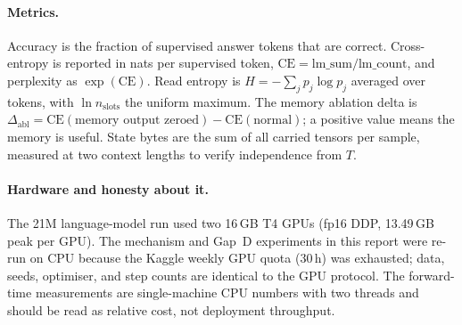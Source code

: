 \paragraph{Metrics.}
Accuracy is the fraction of supervised answer tokens that are correct. Cross-entropy is
reported in nats per supervised token, $\mathrm{CE}=\text{lm\_sum}/\text{lm\_count}$, and
perplexity as $\exp(\mathrm{CE})$. Read entropy is
$H=-\sum_j p_j\log p_j$ averaged over tokens, with $\ln n_{\mathrm{slots}}$ the uniform
maximum. The memory ablation delta is
$\Delta_{\mathrm{abl}}=\mathrm{CE}(\text{memory output zeroed})-\mathrm{CE}(\text{normal})$;
a positive value means the memory is useful. State bytes are the sum of all carried tensors per
sample, measured at two context lengths to verify independence from $T$.

\paragraph{Hardware and honesty about it.}
The 21M language-model run used two 16\,GB T4 GPUs (fp16 DDP, 13.49\,GB peak per GPU). The
mechanism and Gap~D experiments in this report were re-run on CPU because the Kaggle weekly
GPU quota (30\,h) was exhausted; data, seeds, optimiser, and step counts are identical to the
GPU protocol. The forward-time measurements are single-machine CPU numbers with two threads and
should be read as relative cost, not deployment throughput.

